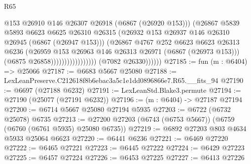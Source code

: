 \begin{lexlean}{R65}
\begin{coremodule}
{                                            @153
                                            @26910
                                            @146
                                            @26307
                                            @26918
                                            (@6867 (@26920 @153)))
                                          (@26867
                                            @5839
                                            @5893
                                            @6623
                                            @6625
                                            @26310
                                            @26315
                                            (@26932
                                              @153
                                              @26937
                                              @146
                                              @26310
                                              @26945
                                              (@6867 (@26947 @153)))
                                            (@26867
                                              @4767
                                              @252
                                              @6623
                                              @6623
                                              @26313
                                              @6236
                                              (@26959
                                                @153
                                                @26963
                                                @146
                                                @26313
                                                @26971
                                                (@6867 (@26973 @153)))
                                              (@6875 @26858)))))))))))))))))
              (@7082 @26330))))))
@27185 := fun (m : @6404) => @25066
@27187 := @6683 @5667 @25080
@27188 := LexLeanPreserve.C212618f8b6ebac3a5c1e1dd0896866e7.R65.__fits_94
@27190 := @6697 (@27188 @6232)
@27191 := LexLeanStd.Blake3.permute
@27194 := @27190 (@25077 (@27191 @6232))
@27196 := (m : @6404) -> @27187 @27194
@27200 := @6714 @5667 @25080 @27194 @5935
@27203 := @6722 (@6732 @25078) @6735
@27213 := @27200 @27203 (@6743 (@6753 @5667)) (@6759 (@6760 (@6761 @5935) @25080 @6735))
@27219 := @6892 @27203 @803 @4634 @5933 @25064 @6623
@27220 := @6441 @6236
@27221 := @6469 @27220
@27222 := @6465 @27221
@27223 := @6445 @27222
@27224 := @6429 @27223
@27225 := @6457 @27224
@27226 := @6453 @27225
@27227 := @6413 @27226
}
\end{coremodule}
\end{lexlean}
